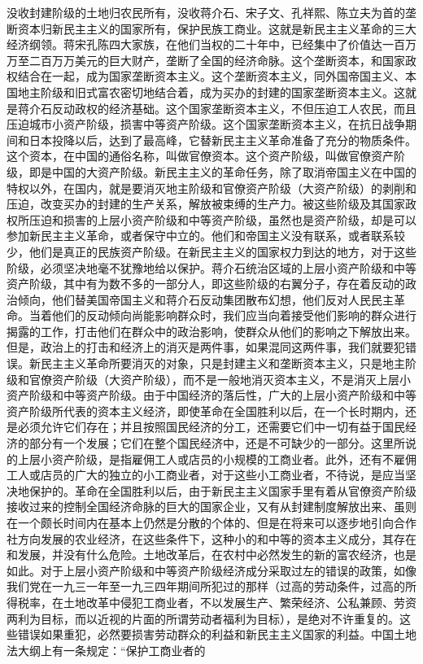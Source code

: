 没收封建阶级的土地归农民所有，没收蒋介石、宋子文、孔祥熙、陈立夫为首的垄断资本归新民主主义的国家所有，保护民族工商业。这就是新民主主义革命的三大经济纲领。蒋宋孔陈四大家族，在他们当权的二十年中，已经集中了价值达一百万万至二百万万美元的巨大财产，垄断了全国的经济命脉。这个垄断资本，和国家政权结合在一起，成为国家垄断资本主义。这个垄断资本主义，同外国帝国主义、本国地主阶级和旧式富农密切地结合着，成为买办的封建的国家垄断资本主义。这就是蒋介石反动政权的经济基础。这个国家垄断资本主义，不但压迫工人农民，而且压迫城市小资产阶级，损害中等资产阶级。这个国家垄断资本主义，在抗日战争期间和日本投降以后，达到了最高峰，它替新民主主义革命准备了充分的物质条件。这个资本，在中国的通俗名称，叫做官僚资本。这个资产阶级，叫做官僚资产阶级，即是中国的大资产阶级。新民主主义的革命任务，除了取消帝国主义在中国的特权以外，在国内，就是要消灭地主阶级和官僚资产阶级（大资产阶级）的剥削和压迫，改变买办的封建的生产关系，解放被束缚的生产力。被这些阶级及其国家政权所压迫和损害的上层小资产阶级和中等资产阶级，虽然也是资产阶级，却是可以参加新民主主义革命，或者保守中立的。他们和帝国主义没有联系，或者联系较少，他们是真正的民族资产阶级。在新民主主义的国家权力到达的地方，对于这些阶级，必须坚决地毫不犹豫地给以保护。蒋介石统治区域的上层小资产阶级和中等资产阶级，其中有为数不多的一部分人，即这些阶级的右翼分子，存在着反动的政治倾向，他们替美国帝国主义和蒋介石反动集团散布幻想，他们反对人民民主革命。当着他们的反动倾向尚能影响群众时，我们应当向着接受他们影响的群众进行揭露的工作，打击他们在群众中的政治影响，使群众从他们的影响之下解放出来。但是，政治上的打击和经济上的消灭是两件事，如果混同这两件事，我们就要犯错误。新民主主义革命所要消灭的对象，只是封建主义和垄断资本主义，只是地主阶级和官僚资产阶级（大资产阶级），而不是一般地消灭资本主义，不是消灭上层小资产阶级和中等资产阶级。由于中国经济的落后性，广大的上层小资产阶级和中等资产阶级所代表的资本主义经济，即使革命在全国胜利以后，在一个长时期内，还是必须允许它们存在；并且按照国民经济的分工，还需要它们中一切有益于国民经济的部分有一个发展；它们在整个国民经济中，还是不可缺少的一部分。这里所说的上层小资产阶级，是指雇佣工人或店员的小规模的工商业者。此外，还有不雇佣工人或店员的广大的独立的小工商业者，对于这些小工商业者，不待说，是应当坚决地保护的。革命在全国胜利以后，由于新民主主义国家手里有着从官僚资产阶级接收过来的控制全国经济命脉的巨大的国家企业，又有从封建制度解放出来、虽则在一个颇长时间内在基本上仍然是分散的个体的、但是在将来可以逐步地引向合作社方向发展的农业经济，在这些条件下，这种小的和中等的资本主义成分，其存在和发展，并没有什么危险。土地改革后，在农村中必然发生的新的富农经济，也是如此。对于上层小资产阶级和中等资产阶级经济成分采取过左的错误的政策，如像我们党在一九三一年至一九三四年期间所犯过的那样（过高的劳动条件，过高的所得税率，在土地改革中侵犯工商业者，不以发展生产、繁荣经济、公私兼顾、劳资两利为目标，而以近视的片面的所谓劳动者福利为目标），是绝对不许重复的。这些错误如果重犯，必然要损害劳动群众的利益和新民主主义国家的利益。中国土地法大纲上有一条规定：“保护工商业者的